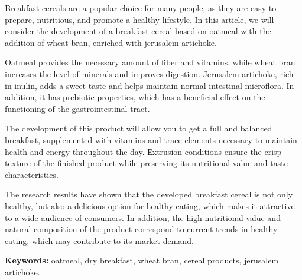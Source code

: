 Breakfast cereals are a popular choice for many people, as they are easy
to prepare, nutritious, and promote a healthy lifestyle. In this
article, we will consider the development of a breakfast cereal based on
oatmeal with the addition of wheat bran, enriched with jerusalem
artichoke.

Oatmeal provides the necessary amount of fiber and vitamins, while wheat
bran increases the level of minerals and improves digestion. Jerusalem
artichoke, rich in inulin, adds a sweet taste and helps maintain normal
intestinal microflora. In addition, it has prebiotic properties, which
has a beneficial effect on the functioning of the gastrointestinal
tract.

The development of this product will allow you to get a full and
balanced breakfast, supplemented with vitamins and trace elements
necessary to maintain health and energy throughout the day. Еxtrusion
conditions ensure the crisp texture of the finished product while
preserving its nutritional value and taste characteristics.

The research results have shown that the developed breakfast cereal is
not only healthy, but also a delicious option for healthy eating, which
makes it attractive to a wide audience of consumers. In addition, the
high nutritional value and natural composition of the product correspond
to current trends in healthy eating, which may contribute to its market
demand.

{\bfseries Keywords:} oatmeal, dry breakfast, wheat bran, cereal products,
jerusalem artichoke.

